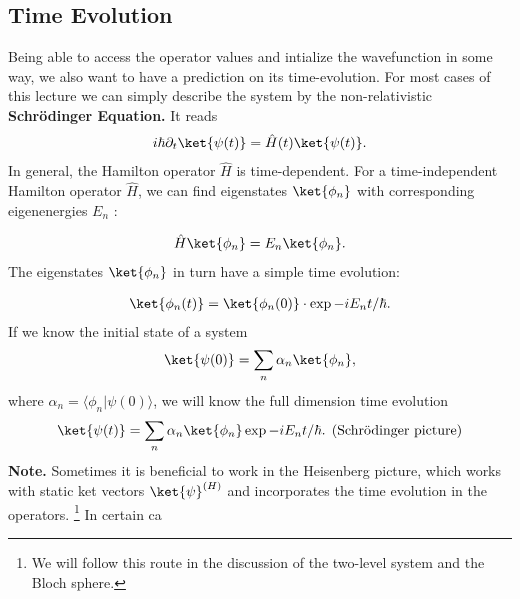 \subsection{Time Evolution}
Being able to access the operator values and intialize the wavefunction in some way, we also want to have a prediction on its time-evolution. For most cases of this lecture we can simply describe the system by the non-relativistic \textbf{Schrödinger Equation.} It reads
\begin{align}
i\hbar\partial_t\ket{\psi(t)}=\hat{H}(t)\ket{\psi(t)}.
\end{align}
In general, the Hamilton operator $\hat{H}$ is time-dependent. For a time-independent Hamilton operator $\hat{H}$, we can find eigenstates $\ket{\phi_n}$ with corresponding eigenenergies $E_n$ :

\begin{align}
\hat{H}\ket{\phi_n}=E_n\ket{\phi_n}.
\end{align}
The eigenstates $\ket{\phi_n}$ in turn have a simple time evolution:

\begin{align}
    \ket{\phi_n(t)}=\ket{\phi_n(0)}\cdot \exp{-i E_nt/\hbar}.
\end{align}
If we know the initial state of a system
\begin{align}
\ket{\psi(0)}=\sum_n \alpha_n\ket{\phi_n},
\end{align}
where $\alpha_n=\langle\phi_n | \psi(0)\rangle$, we will know the full dimension time evolution
\begin{align}
\ket{\psi(t)}=\sum_n\alpha_n\ket{\phi_n}\exp{-i E_n t/\hbar}. \;\, \text{(Schrödinger picture)}
\end{align}
\textbf{Note.} Sometimes it is beneficial to work in the Heisenberg picture, which works with static ket vectors $\ket{\psi}^{(H)}$ and incorporates the time evolution in the operators. \footnote{We will follow this route in the discussion of the two-level system and the Bloch sphere.}
In certain ca
